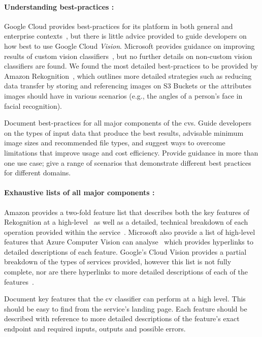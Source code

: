 \paragraph{Understanding best-practices :} Google Cloud provides best-practices for its platform in both general and enterprise contexts~, but there is little advice provided to guide developers on how best to use Google Cloud \textit{Vision}. Microsoft provides guidance on improving results of custom vision classifiers~, but no further details on non-custom vision classifiers are found. We found the most detailed best-practices to be provided by Amazon Rekognition~, which outlines more detailed strategies such as reducing data transfer by storing and referencing images on S3 Buckets or the attributes images should have in various scenarios (e.g., the angles of a person's face in facial recognition).

\begin{leftbar}
\SuggestedImprovement
Document best-practices for all major components of the \gls{cvs}. Guide developers on the types of input data that produce the best results, advisable minimum image sizes and recommended file types, and suggest ways to overcome limitations that improve usage and cost efficiency. Provide guidance in more than one use case; give a range of scenarios that demonstrate different best practices for different domains.
\end{leftbar}

\paragraph{Exhaustive lists of all major  components :} Amazon provides a two-fold feature list that describes both the key features of Rekognition at a high-level~ as well as a detailed, technical breakdown of each  operation provided within the service~. Microsoft also provide a list of high-level features that Azure Computer Vision can analyse~ which provides hyperlinks to detailed descriptions of each feature. Google's Cloud Vision  provides a partial breakdown of the types of services provided, however this list is not fully complete, nor are there hyperlinks to more detailed descriptions of each of the features~.

\begin{leftbar}
\SuggestedImprovement
Document key features that the \gls{cv} classifier can perform at a high level. This should be easy to find from the service's landing page. Each feature should be described with reference to more detailed descriptions of the feature's exact  endpoint and required inputs, outputs and possible errors.
\end{leftbar}

